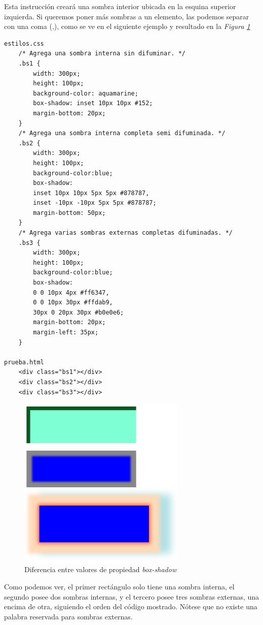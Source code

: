 Esta instrucción creará una sombra interior ubicada en la esquina superior izquierda. Si queremos poner más sombras a un elemento, las podemos separar con una coma (,), como se ve en el siguiente ejemplo y resultado en la \textit{Figura \ref{fig: 35}}
\begin{lstlisting}
estilos.css
    /* Agrega una sombra interna sin difuminar. */
    .bs1 {
        width: 300px;
        height: 100px;
        background-color: aquamarine;
        box-shadow: inset 10px 10px #152;
        margin-bottom: 20px;
    }
    /* Agrega una sombra interna completa semi difuminada. */
    .bs2 {
        width: 300px;
        height: 100px;
        background-color:blue;
        box-shadow: 
        inset 10px 10px 5px 5px #878787,
        inset -10px -10px 5px 5px #878787;
        margin-bottom: 50px;
    }
    /* Agrega varias sombras externas completas difuminadas. */
    .bs3 {
        width: 300px;
        height: 100px;
        background-color:blue;
        box-shadow: 
        0 0 10px 4px #ff6347,
        0 0 10px 30px #ffdab9,
        30px 0 20px 30px #b0e0e6;
        margin-bottom: 20px;
        margin-left: 35px;
    }

prueba.html
    <div class="bs1"></div>
    <div class="bs2"></div>
    <div class="bs3"></div>
\end{lstlisting}
\begin{figure}[H]
    \centering
    \caption{Diferencia entre valores de propiedad \textit{box-shadow}}
    \label{fig: 35}
    \includegraphics[width=8cm]{ss/box-shadow2.png}
\end{figure}

Como podemos ver, el primer rectángulo solo tiene una sombra interna, el segundo posee dos sombras internas, y el tercero posee tres sombras externas, una encima de otra, siguiendo el orden del código mostrado. Nótese que no existe una palabra reservada para sombras externas.


